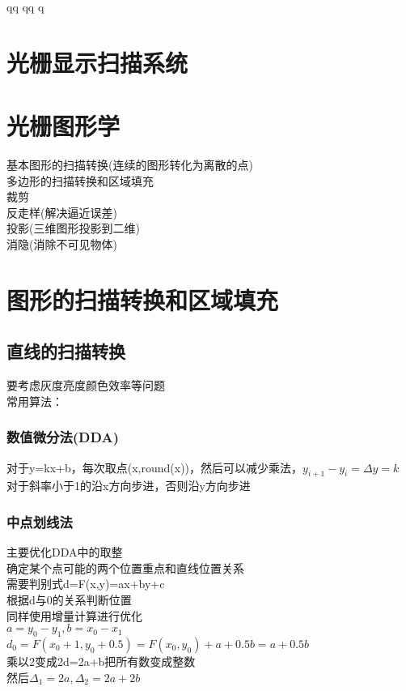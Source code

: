 qq	qq	q                                                                                                                                                                                                                                                                                      \documentclass{article}
\begin{document}
\begin{CJK}{UTF8}{gbsn}
\section{光栅显示扫描系统}



\section{光栅图形学}
	基本图形的扫描转换(连续的图形转化为离散的点)\\
	多边形的扫描转换和区域填充\\
	裁剪\\
	反走样(解决逼近误差)\\
	投影(三维图形投影到二维)\\
	消隐(消除不可见物体)\\
\section{图形的扫描转换和区域填充}
	\subsection{直线的扫描转换}
	要考虑灰度亮度颜色效率等问题\\
	常用算法：\\
	\subsubsection{数值微分法(DDA)}
	对于y=kx+b，每次取点(x,round(x))，然后可以减少乘法，$y_{i+1}-y_i=\Delta y=k$\\
	对于斜率小于1的沿x方向步进，否则沿y方向步进\\
	\subsubsection{中点划线法}	
	主要优化DDA中的取整\\
	确定某个点可能的两个位置重点和直线位置关系\\
	需要判别式d=F(x,y)=ax+by+c\\
	根据d与0的关系判断位置\\
	同样使用增量计算进行优化\\
	$a=y_0-y_1,b=x_0-x_1$\\
	$d_0=F(x_0+1,y_0+0.5)=F(x_0,y_0)+a+0.5b=a+0.5b$\\
	乘以2变成2d=2a+b把所有数变成整数\\
	然后$\Delta_1=2a,\Delta_2=2a+2b$\\

\end{CJK}
\end{document}
